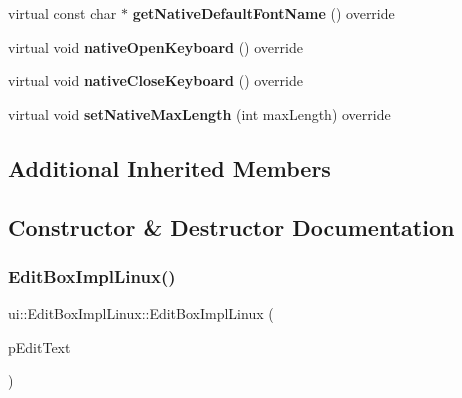 \begin{DoxyCompactItemize}
\mbox{\label{classui_1_1EditBoxImplLinux_a5b5217e214a33c828328a97fdf855a8e}} 
virtual const char $\ast$ {\bfseries get\+Native\+Default\+Font\+Name} () override
\item 
\mbox{\label{classui_1_1EditBoxImplLinux_a09d295ee35e299fcdc51168ee05dcee6}} 
virtual void {\bfseries native\+Open\+Keyboard} () override
\item 
\mbox{\label{classui_1_1EditBoxImplLinux_af563fee51a75e14e2165a94c8e19dd10}} 
virtual void {\bfseries native\+Close\+Keyboard} () override
\item 
\mbox{\label{classui_1_1EditBoxImplLinux_a0e4e8c30225c6f1f6038f2de5e00e9b4}} 
virtual void {\bfseries set\+Native\+Max\+Length} (int max\+Length) override
\end{DoxyCompactItemize}
\subsection*{Additional Inherited Members}


\subsection{Constructor \& Destructor Documentation}
\mbox{\label{classui_1_1EditBoxImplLinux_a1547fb366cb608504b34087736432c76}} 
\subsubsection{\texorpdfstring{Edit\+Box\+Impl\+Linux()}{EditBoxImplLinux()}\hspace{0.1cm}{\footnotesize\ttfamily [1/2]}}
{\footnotesize\ttfamily ui\+::\+Edit\+Box\+Impl\+Linux\+::\+Edit\+Box\+Impl\+Linux (\begin{DoxyParamCaption}\item[{\hyperlink{classui_1_1EditBox}{Edit\+Box} $\ast$}]{p\+Edit\+Text }\end{DoxyParamCaption})}

